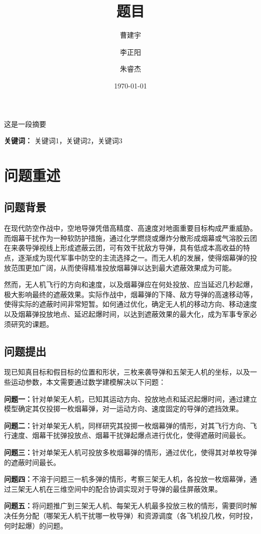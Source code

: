 \documentclass{ctexart}
\title{题目}
\author{曹建宇 \and 李正阳 \and 朱睿杰}
\date{\today}
\newcommand{\keywords}[1]{\par\noindent\textbf{关键词：} #1}
\renewenvironment{abstract}
 {\par\large\begin{center}\textbf{\large\abstractname}\end{center}\par\noindent\ignorespaces}
 {\par}
\begin{document}
\maketitle 
\begin{abstract}  %
这是一段摘要
\end{abstract}
\keywords{关键词1，关键词2，关键词3}  %
\newpage

\tableofcontents
\newpage
\section{问题重述} 
\subsection{问题背景}
在现代防空作战中，空地导弹凭借高精度、高速度对地面重要目标构成严重威胁。而烟幕干扰作为一种软防护措施，通过化学燃烧或爆炸分散形成烟幕或气溶胶云团在来袭导弹视线上形成遮蔽云团，可有效干扰敌方导弹，具有低成本高收益的特点，逐渐成为现代军事中防空的主流选择之一。而无人机的发展，使得烟幕弹的投放范围更加广阔，从而使得精准投放烟幕弹以达到最大遮蔽效果成为可能。

然而，无人机飞行的方向和速度，以及烟幕弹应在何处投放、应当延迟几秒起爆，极大影响最终的遮蔽效果。实际作战中，烟幕弹的下降、敌方导弹的高速移动等，使得实际的遮蔽时间非常短暂。如何通过优化，确定无人机的移动方向、移动速度以及烟幕弹投放地点、延迟起爆时间，以达到遮蔽效果的最大化，成为军事专家必须研究的课题。
\subsection{问题提出}
现已知真目标和假目标的位置和形状，三枚来袭导弹和五架无人机的坐标，以及一些运动参数，本文需要通过数学建模解决以下问题：

\textbf{问题一：}针对单架无人机，已知其运动方向、投放地点和延迟起爆时间，通过建立模型确定其仅投掷一枚烟幕弹，对一运动方向、速度固定的导弹的遮挡效果。

\textbf{问题二：}针对单架无人机，同样研究其投掷一枚烟幕弹的情形，对其飞行方向、飞行速度、烟幕干扰弹投放点、烟幕干扰弹起爆点进行优化，使得遮蔽时间最长。

\textbf{问题三：}针对单架无人机可投放多枚烟幕弹的情形，通过优化，使得其对单枚导弹的遮蔽时间最长。

\textbf{问题四：}不溶于问题三一机多弹的情形，考察三架无人机，各投放一枚烟幕弹，通过三架无人机在三维空间中的配合协调实现对于导弹的最佳屏蔽效果。

\textbf{问题五：}将问题推广到三架无人机、每架无人机最多投放三枚的情形，需要同时解决任务分配（哪架无人机干扰哪一枚导弹）和资源调度（各飞机投几枚，何时投，何时起爆）的问题。
\end{document}
